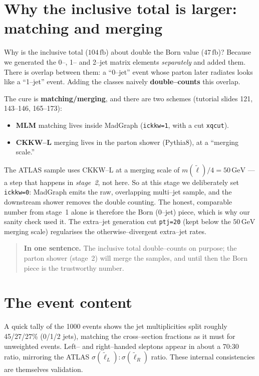 \documentclass[11pt,oneside]{report}
\newcommand{\code}[1]{\texttt{#1}}
\newcommand{\slep}{\tilde{\ell}}
\newcommand{\fb}{\,\text{fb}}
\newcommand{\GeV}{\,\text{GeV}}
\begin{document}
\section{Why the inclusive total is larger: matching and merging}
\label{sec:merging}
Why is the inclusive total ($104\fb$) about double the Born value ($47\fb$)? Because we generated
the 0--, 1-- and 2--jet matrix elements \emph{separately} and added them. There is overlap between
them: a ``0--jet'' event whose parton later radiates looks like a ``1--jet'' event. Adding the
classes naively \textbf{double--counts} this overlap.

The cure is \textbf{matching/merging}, and there are two schemes (tutorial slides 121, 143--146,
165--173):
\begin{itemize}[nosep]
  \item \textbf{MLM} matching lives inside MadGraph (\code{ickkw=1}, with a cut \code{xqcut}).
  \item \textbf{CKKW--L} merging lives in the parton shower (Pythia8), at a ``merging scale.''
\end{itemize}
The ATLAS sample uses CKKW--L at a merging scale of $m(\slep)/4 = 50\GeV$ --- a step that happens in
\emph{stage~2}, not here. So at this stage we deliberately set \code{ickkw=0}: MadGraph emits the
raw, overlapping multi--jet sample, and the downstream shower removes the double counting. The
honest, comparable number from stage~1 alone is therefore the Born (0--jet) piece, which is why our
sanity check used it. The extra--jet generation cut \code{ptj=20} (kept below the $50\GeV$ merging
scale) regularises the otherwise--divergent extra--jet rates.

\begin{quote}\textbf{In one sentence.} The inclusive total double--counts on purpose; the parton
shower (stage~2) will merge the samples, and until then the Born piece is the trustworthy
number.\end{quote}

\section{The event content}
A quick tally of the 1000 events shows the jet multiplicities split roughly 45/27/27\% (0/1/2 jets),
matching the cross--section fractions as it must for unweighted events. Left-- and right--handed
sleptons appear in about a 70:30 ratio, mirroring the ATLAS $\sigma(\slep_L):\sigma(\slep_R)$ ratio.
These internal consistencies are themselves validation.
\end{document}
